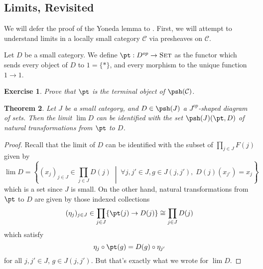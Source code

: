 \documentclass[11pt]{article}
\theoremstyle{plain}
\newtheorem{thm}{Theorem}[subsection]
\newtheorem{exrc}[thm]{Exercise}
\theoremstyle{definition}
\newcommand{\s}[1]{\mathcal{#1}}
\newcommand{\Set}{{\textsc{Set}}}
\begin{document}
\subsection{Limits, Revisited}

We will defer the proof of the Yoneda lemma to . First, we will attempt to understand limits in a locally small category $\s C$ via presheaves on $\s C$.

Let $D$ be a small category. We define $\pt : D^{op} \to \Set$ as the functor which sends every object of $D$ to $1 = \{*\}$, and every morphism to the unique function $1 \to 1$.

\begin{exrc}
    Prove that $\pt$ is the terminal object of $\psh(\s C)$.
\end{exrc}

\begin{thm}
    Let $J$ be a small category, and $D \in \psh(J)$ a $J^{op}$-shaped diagram of sets. Then the limit $\lim D$ can be identified with the set $\psh(J)(\pt, D)$ of natural transformations from $\pt$ to $D$.
\end{thm}

\begin{proof}
    Recall that the limit of $D$ can be identified with the subset of $\prod_{j \in J} F(j)$ given by
    \begin{equation*}
        \lim D =
            \left\{
                (x_j)_{j \in J} \in \prod_{j \in J} D(j)\;
            \middle|
                \;\forall j, j' \in J, g \in J(j,j'),\; D(j)(x_{j'}) = x_j
            \right\}
    \end{equation*}
    which is a set since $J$ is small. On the other hand, natural transformations from $\pt$ to $D$ are given by those indexed collections
    \begin{equation*}
        (\eta_j)_{j \in J} \in \prod_{j \in J} \{\pt(j) \to D(j)\} \cong \prod_{j \in J} D(j)
    \end{equation*}
    which satisfy
    \begin{equation*}
        \eta_j \circ \pt(g) = D(g) \circ \eta_{j'}
    \end{equation*}
    for all $j,j' \in J$, $g \in J(j,j')$. But that's exactly what we wrote for $\lim D$.
\end{proof}

\begin{comment}
\begin{exrc}
    Let $D = \{A, B\}$ be the category with two objects and only identity morphisms.
    Let $X$ and $Y$ be sets, and define a contravariant functor $F : D^{op} \to \Set$ which sends $A$ to $X$ and $B$ to $Y$.
    Describe an interpretation of natural transformations $\pt \Rightarrow F$ as pairs $(x,y) \in X \times Y$. Generalize your interpretation to the case where $D$ consists of an arbitrary set of objects and only identity morphisms.
\end{exrc}
\end{comment}
\end{document}
